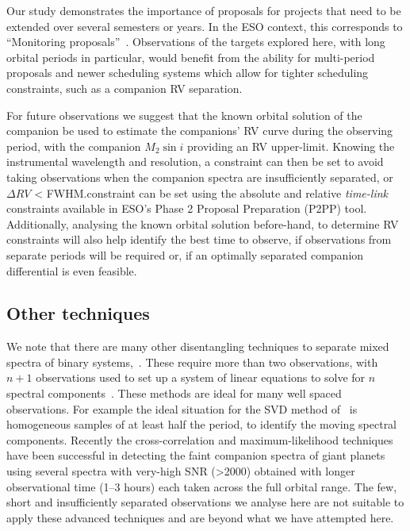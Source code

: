 \documentclass[fleqn,usenatbib]{mnras}
\begin{document}
Our study demonstrates the importance of proposals for projects that need to be extended over several semesters or years. In the ESO context, this corresponds to ``Monitoring proposals''~\citep[e.g.][pg. 18]{eso_eso_2017}. Observations of the targets explored here, with long orbital periods in particular, would benefit from the ability for multi-period proposals and newer scheduling systems which allow for tighter scheduling constraints, such as a companion RV separation.

For future observations we suggest that the known orbital solution of the companion be used to estimate the companions' RV curve during the observing period, with the companion \(M_2\sin{i}\) providing an RV upper-limit. Knowing the instrumental wavelength and resolution, a constraint can then be set to avoid taking observations when the companion spectra are insufficiently separated, or \(\Delta RV\) < FWHM.\@This constraint can be set using the absolute and relative \emph{time-link} constraints available in ESO's Phase 2 Proposal Preparation (P2PP) tool.
Additionally, analysing the known orbital solution before-hand, to determine RV constraints will also help identify the best time to observe, if observations from separate periods will be required or, if an optimally separated companion differential is even feasible.

\subsection{Other techniques}
We note that there are many other disentangling techniques to separate mixed spectra of binary systems,~\citep[e.g.][]{hadrava_disentangling_2009}. These require more than two observations, with  \(n+1\) observations used to set up a system of linear equations to solve for \(n\) spectral components~\citep[e.g.][]{simon_disentangling_1994,czekala_disentangling_2017, sablowski_spectral_2016}. These methods are ideal for many well spaced observations. For example the ideal situation for the SVD method of~\citet{sablowski_spectral_2016} is homogeneous samples of at least half the period, to identify the moving spectral components.
{Recently the cross-correlation and maximum-likelihood techniques~\citep[e.g.][]{lockwood_nearir_2014, piskorz_evidence_2016} have been successful in detecting the faint companion spectra of giant planets using several spectra with very-high SNR (>2000) obtained with longer observational time (1--3 hours) each taken across the full orbital range.} The few, short and insufficiently separated observations we analyse here are not suitable to apply these advanced techniques and are beyond what we have attempted here.
\end{document}

